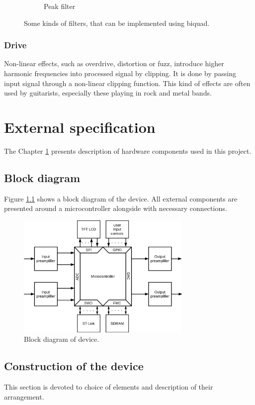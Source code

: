 \documentclass[a4paper,twoside,12pt]{book}
\begin{document}
\begin{figure}[H]
\begin{subfigure}[t]{0.25\textwidth}
        \label{fig:peak}
        \caption{Peak filter}
    \end{subfigure}
    \caption{Some kinds of filters, that can be implemented using biquad\cite{Zolzer2}.}
    \label{fig:biquad}
\end{figure}

\subsection{Drive}
Non-linear effects, such as overdrive, distortion or fuzz,
introduce higher harmonic frequencies into processed signal by clipping.
It is done by passing input signal through a non-linear clipping function.
This kind of effects are often used by guitarists,
especially these playing in rock and metal bands.


\chapter{External specification}\label{ch:external}
The Chapter \ref{ch:external} presents description of hardware components used in this project.

\section{Block diagram}
Figure \ref{fig:block} shows a block diagram of the device.
All external components are presented around a microcontroller
alongside with necessary connections.

\begin{figure}[H]
    \centering
    \includegraphics[width=0.75\textwidth]{images/Block}
    \caption{Block diagram of device.}
    \label{fig:block}
\end{figure}

\section{Construction of the device}
This section is devoted to choice of elements
and description of their arrangement.
\end{document}
